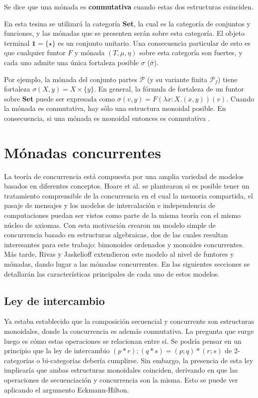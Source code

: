 Se dice que una mónada es \textbf{conmutativa} cuando estas dos estructuras coinciden.

En esta tesina se utilizará la categoría \textbf{Set}, la cual es la categoría de conjuntos y funciones, y las mónadas que se presenten serán sobre esta categoría. El objeto terminal $\mathbf{1} = \{\star\}$ es un conjunto unitario. Una consecuencia particular de esto es que cualquier funtor $\mathit{F}$ y mónada $(\mathit{T},\mu,\eta)$ sobre esta categoría son fuertes, y cada uno admite una única fortaleza posible $\sigma$ ($\bar{\sigma}$). 

Por ejemplo, la mónada del conjunto partes $\mathcal{P}$ (y su variante finita $\mathcal{P}_f$) tiene fortaleza $\sigma(X,y) = X \times \{y\}$. En general, la fórmula de fortaleza de un funtor sobre \textbf{Set} puede ser expresada como $\sigma(v,y) = \mathit{F}(\lambda x : X . (x,y))(v)$. Cuando la mónada es conmutativa, hay sólo una estructura monoidal posible. En consecuencia, si una mónada es monoidal entonces es conmutativa \cite{kock:1970}. 

\section{Mónadas concurrentes}\label{monconc:mc}

La teoría de concurrencia está compuesta por una amplia variedad de modelos basados en diferentes conceptos. Hoare et al. \cite{hoare:2011} se plantearon si es posible tener un tratamiento comprensible de la concurrencia en el cual la memoria compartida, el pasaje de mensajes y los modelos de intercalación e independencia de computaciones puedan ser vistos como parte de la misma teoría con el mismo núcleo de axiomas. Con esta motivación crearon un modelo simple de concurrencia basado en estructuras algebraicas, dos de las cuales resultan interesantes para este trabajo: bimonoides ordenados y monoides concurrentes. Más tarde, Rivas y Jaskelioff \cite{rivas:2019} extendieron este modelo al nivel de funtores y mónadas, dando lugar a las mónadas concurrentes. En las siguientes secciones se detallarán las características principales de cada uno de estos modelos.

\subsection{Ley de intercambio}\label{mc:interchange}

Ya estaba establecido que la composición secuencial y concurrente son estructuras monoidales, donde la concurrencia es además conmutativa. La pregunta que surge luego es cómo estas operaciones se relacionan entre sí. Se podría pensar en un principio que la ley de intercambio $(p * r) ; (q * s) = (p ; q) * (r ; s)$ de 2-categorías o bi-categorías debería cumplirse.  Sin embargo, la presencia de esta ley implicaría que ambas estructuras monoidales coinciden, derivando en que las operaciones de secuenciación y concurrencia son la misma. Esto se puede ver aplicando el argumento Eckmann-Hilton. 

